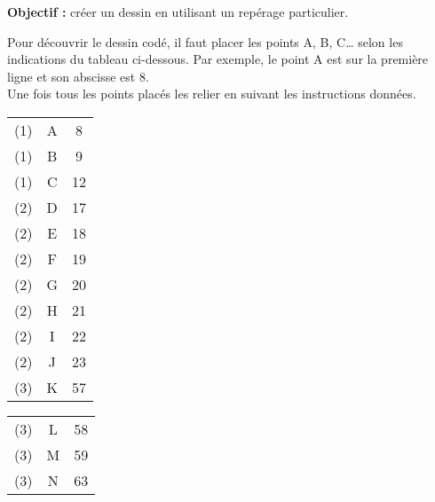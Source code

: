 \activites

\begin{activite}
   {\bf Objectif :} créer un dessin en utilisant un repérage particulier. \\ [-5mm]
   \begin{QCM}
      Pour découvrir le dessin codé, il faut placer les points A, B, C\dots{} selon les indications du tableau ci-dessous. Par exemple, le point A est sur la première ligne et son abscisse est 8. \\
      Une fois tous les points placés les relier en suivant les instructions données.
      \begin{center}
         \begin{tabular}{|*{3}{C{0.5}|}}
            \hline
             &  &  \\
            \hline
            (1) & A & 8 \\
            \hline
            (1) & B & 9 \\
            \hline
            (1) & C & 12 \\
            \hline
            (2) & D & 17 \\
            \hline
            (2) & E & 18 \\
            \hline
            (2) & F& 19 \\
            \hline
            (2) & G & 20 \\
            \hline
            (2) & H & 21 \\
            \hline
            (2) & I & 22 \\
            \hline
            (2) & J & 23 \\
            \hline
            (3) & K & 57 \\
            \hline
         \end{tabular}
         \hfill
         \begin{tabular}{|*{3}{C{0.5}|}}
            \hline
             &  &  \\
            \hline
            (3) &  L & 58 \\
            \hline
            (3) & M & 59 \\
            \hline
            (3) & N & 63 \\

\end{tabular}
\end{center}
\end{QCM}
\end{activite}
